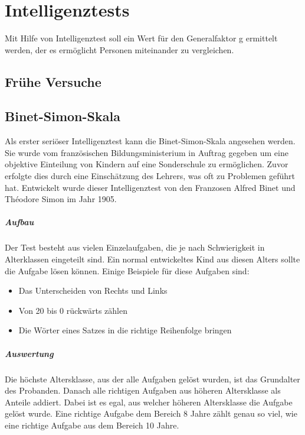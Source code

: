 \chapter{Intelligenztests}
Mit Hilfe von Intelligenztest soll ein Wert für den Generalfaktor g ermittelt werden, der es ermöglicht Personen miteinander zu vergleichen.

\section{Frühe Versuche}
\section{Binet-Simon-Skala}
Als erster \glqq seriöser\grqq{} Intelligenztest kann die Binet-Simon-Skala angesehen werden. Sie wurde vom französischen Bildungsministerium in Auftrag gegeben um eine objektive Einteilung von Kindern auf eine Sonderschule zu ermöglichen. Zuvor erfolgte dies durch eine Einschätzung des Lehrers, was oft zu Problemen geführt hat. Entwickelt wurde dieser Intelligenztest von den Franzosen Alfred Binet und Théodore Simon im Jahr 1905.

\paragraph{Aufbau}
Der Test besteht aus vielen Einzelaufgaben, die je nach Schwierigkeit in Alterklassen eingeteilt sind. Ein normal entwickeltes Kind aus diesen Alters sollte die Aufgabe lösen können. Einige Beispiele für diese Aufgaben sind:
\begin{itemize}
  \item{Das Unterscheiden von Rechts und Links}
  \item{Von 20 bis 0 rückwärts zählen}
  \item{Die Wörter eines Satzes in die richtige Reihenfolge bringen}
\end{itemize}

\paragraph{Auswertung}
Die höchste Altersklasse, aus der alle Aufgaben gelöst wurden, ist das Grundalter des Probanden.
Danach alle richtigen Aufgaben aus höheren Altersklasse als Anteile addiert. Dabei ist es egal, aus welcher höheren Altersklasse die Aufgabe gelöst wurde. Eine richtige Aufgabe dem Bereich 8 Jahre zählt genau so viel, wie eine richtige Aufgabe aus dem Bereich 10 Jahre.

